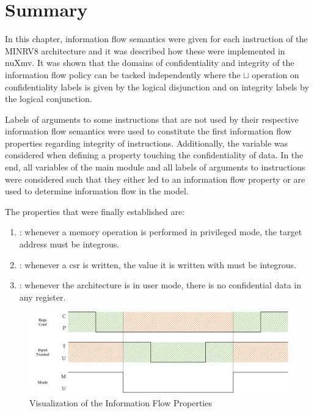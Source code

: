 \section{Summary}

In this chapter, information flow semantics were given for each instruction of the MINRV8 architecture and it was described how these were implemented in nuXmv.
It was shown that the domains of confidentiality and integrity of the information flow policy can be tacked independently where the $ \sqcup $ operation on confidentiality labels is given by the logical disjunction and on integrity labels by the logical conjunction.

Labels of arguments to some instructions that are not used by their respective information flow semantics were used to constitute the first information flow properties regarding integrity of instructions.
Additionally, the  variable was considered when defining a property touching the confidentiality of data.
In the end, all variables of the main module and all labels of arguments to instructions were considered such that they either led to an information flow property or are used to determine information flow in the model.

The properties that were finally established are:
\begin{enumerate}[label=\Roman*.]
    \item {}: whenever a memory operation is performed in privileged mode, the target address must be integrous.
    \item {}: whenever a \gls{csr} is written, the value it is written with must be integrous.
    \item {}: whenever the architecture is in user mode, there is no confidential data in any register.
\end{enumerate}

\begin{figure}
    \includegraphics[width=\textwidth]{figures/properties.png}
    \caption{Visualization of the Information Flow Properties}
    \label{fig:ifc-properties}
\end{figure}

